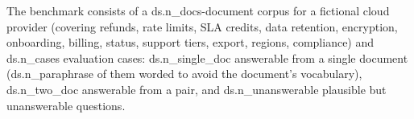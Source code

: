 The benchmark consists of a {{ds.n_docs}}-document corpus for a fictional cloud
provider (covering refunds, rate limits, SLA credits, data retention,
encryption, onboarding, billing, status, support tiers, export, regions,
compliance) and {{ds.n_cases}} evaluation cases: {{ds.n_single_doc}} answerable from a single
document ({{ds.n_paraphrase}} of them worded to avoid the document's vocabulary), {{ds.n_two_doc}}
answerable from a pair, and {{ds.n_unanswerable}} plausible but unanswerable questions.
